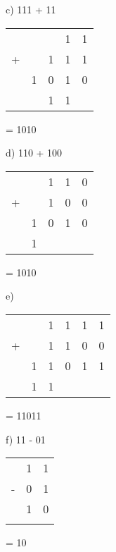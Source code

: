 \begin{figure}[H]
    \begin{minipage}[t]{0.45\textwidth}
        c) 111 + 11
        \begin{table}[H]
            \centering
            \begin{tabularx}{0.5\linewidth}{rXXXX}
                & & & 1 & 1\\
                + &  & 1 & 1 & 1\\
                \cline{2-5}
               & 1 & 0 & 1 & 0 \\
                \cline{2-5}
                & & 1 & 1 &
            \end{tabularx}
        \end{table}
        = 1010
    \end{minipage}\hfill
    \begin{minipage}[t]{0.45\textwidth}
        d) 110 + 100
        \begin{table}[H]
            \centering
            \begin{tabularx}{0.5\linewidth}{rXXXX}
                & & 1 & 1 & 0\\
                + &  & 1 & 0 & 0\\
                \cline{2-5}
               & 1 & 0 & 1 & 0 \\
                \cline{2-5}
                & 1 &  &  &
            \end{tabularx}
        \end{table}
        = 1010
    \end{minipage}\hfill
\end{figure}

\begin{figure}[H]
    \begin{minipage}[t]{0.45\textwidth}
        e) 
        \begin{table}[H]
            \centering
            \begin{tabularx}{0.5\linewidth}{rXXXXX}
                & & 1 & 1 & 1 & 1\\
                + &  & 1 & 1 & 0 &0 \\
                \cline{2-6}
               & 1 & 1 & 0 & 1 & 1 \\
                \cline{2-6}
                & 1 & 1 &  & & 
            \end{tabularx}
        \end{table}
        = 11011
    \end{minipage}\hfill
    \begin{minipage}[t]{0.45\textwidth}
        f) 11 - 01
    \begin{table}[H]
        \centering
        \begin{tabularx}{0.5\linewidth}{rXX}
            & 1 & 1\\
            - & 0 & 1\\
            \cline{2-3}
            & 1 & 0 \\
            \cline{2-3}
            &  &
        \end{tabularx}
    \end{table}
    = 10
    \end{minipage}\hfill
\end{figure}

